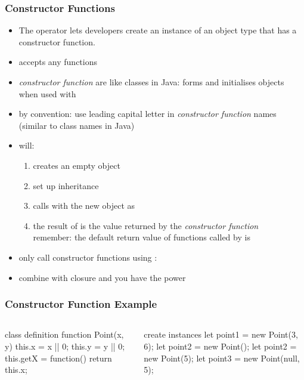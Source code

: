 \begin{frame}[fragile] \frametitle{Constructor Functions}

\begin{itemize}
  \item The  operator lets developers create an instance of an object type that has a constructor function.
  \item {} accepts any functions
  \item \emph{constructor function} are like classes in Java: forms and initialises objects when used with 
  \item by convention: use leading capital letter in \emph{constructor function} names (similar to class names in Java)
  \item {} will:
  \begin{enumerate}
    \item creates an empty object
    \item set up inheritance
    \item calls  with the new object as 
    \item the result of  is the value returned by the \emph{constructor function}\\
             remember: the default return value of functions called by  is 
  \end{enumerate}
  \item only call constructor functions using :
  \item combine with closure and you have the power
\end{itemize}
\end{frame}

\begin{frame}[fragile] \frametitle{Constructor Function Example}

\begin{columns}[onlytextwidth]
  \begin{column}{0.5\textwidth}
\begin{CodeBox}{class definition}
function Point(x, y) {
  this.x = x || 0;
  this.y = y || 0;
  this.getX = function() {
    return this.x;
  }
}
\end{CodeBox}
  \end{column}
  \begin{column}{0.5\textwidth}
\begin{CodeBox}{create instances}
let point1 = new Point(3, 6);
let point2 = new Point();
let point2 = new Point(5);
let point3 = 
  new Point(null, 5);
\end{CodeBox}
  \end{column}
\end{columns}%
\end{frame}

